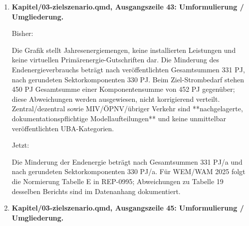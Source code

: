 \documentclass[
  ngerman,
  a4paper,
  DIV=11]{scrreprt}
\newenvironment{Shaded}{\begin{snugshade}}{\end{snugshade}}
\newcommand{\NormalTok}[1]{\textcolor[rgb]{0.00,0.23,0.31}{#1}}
\begin{document}
\begin{enumerate}
  Bisher:

\begin{Shaded}
\begin{Highlighting}[]
\NormalTok{![Stromausbau und Strombedarf sowie getrennt dargestellte Endenergieminderung: Transition 2040 gegenüber 2020.](../Abbildungen/transition\_sankey.png)\{\#fig{-}transition{-}sankey\}}
\end{Highlighting}
\end{Shaded}

  Jetzt:

\begin{Shaded}
\begin{Highlighting}[]
\NormalTok{![Stromausbau, Strombedarf und Endenergieminderung gegenüber 2020.](../Abbildungen/transition\_sankey.png)\{\#fig{-}transition{-}sankey\}}
\end{Highlighting}
\end{Shaded}
\item
  \textbf{Kapitel/03-zielszenario.qmd, Ausgangszeile 43: Umformulierung
  / Umgliederung.}

  Bisher:

\begin{Shaded}
\begin{Highlighting}[]
\NormalTok{Die Grafik stellt Jahresenergiemengen, keine installierten Leistungen und keine virtuellen Primärenergie{-}Gutschriften dar. Die Minderung des Endenergieverbrauchs beträgt nach veröffentlichten Gesamtsummen 331 PJ, nach gerundeten Sektorkomponenten 330 PJ. Beim Ziel{-}Strombedarf stehen 450 PJ Gesamtsumme einer Komponentensumme von 452 PJ gegenüber; diese Abweichungen werden ausgewiesen, nicht korrigierend verteilt. Zentral/dezentral sowie MIV/ÖPNV/übriger Verkehr sind **nachgelagerte, dokumentationspflichtige Modellaufteilungen** und keine unmittelbar veröffentlichten UBA{-}Kategorien.}
\end{Highlighting}
\end{Shaded}

  Jetzt:

\begin{Shaded}
\begin{Highlighting}[]
\NormalTok{Die Minderung der Endenergie beträgt nach Gesamtsummen 331 PJ/a und nach gerundeten Sektorkomponenten 330 PJ/a. Für WEM/WAM 2025 folgt die Normierung Tabelle E in REP{-}0995; Abweichungen zu Tabelle 19 desselben Berichts sind im Datenanhang dokumentiert.}
\end{Highlighting}
\end{Shaded}
\item
  \textbf{Kapitel/03-zielszenario.qmd, Ausgangszeile 45: Umformulierung
  / Umgliederung.}


\end{enumerate}
\end{document}
